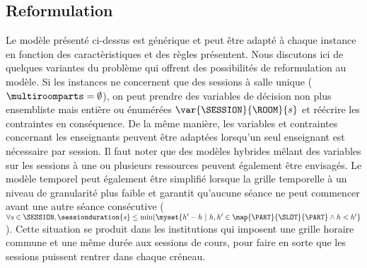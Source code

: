 \subsection{Reformulation}
\label{sec:model-reformulation}

Le modèle présenté ci-dessus est générique et peut être adapté à chaque instance en fonction des caractèristiques et des règles présentent.
Nous discutons ici de quelques variantes du problème \UTP{} qui offrent des possibilités de reformulation au modèle.
Si les instances ne concernent que des sessions à salle unique ($\multiroomparts=\emptyset$),
on peut prendre des variables de décision non plus ensembliste mais entière ou énumérées
$\var{\SESSION}{\ROOM}{s}$ et réécrire les contraintes en conséquence. 
De la même manière, les variables et contraintes concernant les enseignants peuvent être adaptées lorsqu'un seul enseignant est nécessaire par session.
Il faut noter que des modèles hybrides mêlant des variables sur les sessions à une ou plusieurs ressources peuvent également être envisagés.
Le modèle temporel peut également être simplifié 
lorsque la grille temporelle 
à un niveau de granularité plus faible%
et garantit qu'aucune séance
ne peut commencer avant une autre séance consécutive
($\forall s\in\SESSION, \sessionduration{s}\leq\min(\myset{h'-h\ |\  h,h'\in\map{\PART}{\SLOT}{\PART}\wedge h<h'}$).
Cette situation se produit dans les institutions qui imposent une grille horaire commune et une même durée aux sessions de cours, pour faire en sorte que les sessions puissent rentrer dans  chaque créneau.

